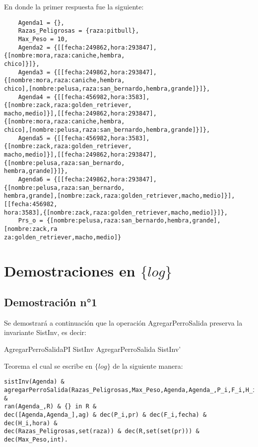 \documentclass[12pt,zed]{article}
\begin{document}
En donde la primer respuesta fue la siguiente:
\begin{verbatim}
    Agenda1 = {},  
    Razas_Peligrosas = {raza:pitbull},  
    Max_Peso = 10,  
    Agenda2 = {[[fecha:249862,hora:293847],{[nombre:mora,raza:caniche,hembra,
chico]}]},  
    Agenda3 = {[[fecha:249862,hora:293847],{[nombre:mora,raza:caniche,hembra,
chico],[nombre:pelusa,raza:san_bernardo,hembra,grande]}]},  
    Agenda4 = {[[fecha:456982,hora:3583],{[nombre:zack,raza:golden_retriever,
macho,medio]}],[[fecha:249862,hora:293847],{[nombre:mora,raza:caniche,hembra,
chico],[nombre:pelusa,raza:san_bernardo,hembra,grande]}]},  
    Agenda5 = {[[fecha:456982,hora:3583],{[nombre:zack,raza:golden_retriever,
macho,medio]}],[[fecha:249862,hora:293847],{[nombre:pelusa,raza:san_bernardo,
hembra,grande]}]},  
    Agenda6 = {[[fecha:249862,hora:293847],{[nombre:pelusa,raza:san_bernardo,
hembra,grande],[nombre:zack,raza:golden_retriever,macho,medio]}],[[fecha:456982,
hora:3583],{[nombre:zack,raza:golden_retriever,macho,medio]}]},  
    Prs_o = {[nombre:pelusa,raza:san_bernardo,hembra,grande],[nombre:zack,ra
za:golden_retriever,macho,medio]}
\end{verbatim}

\section*{Demostraciones en $\{log\}$}

\subsection*{Demostración n°1}

Se demostrará a continuación que la operación AgregarPerroSalida preserva la invariante SistInv, es decir: \\

\begin{theorem}{AgregarPerroSalidaPI}
SistInv \land AgregarPerroSalida \implies SistInv'
\end{theorem}

Teorema el cual se escribe en $\{log\}$ de la siguiente manera:

\begin{verbatim}
sistInv(Agenda) &
agregarPerroSalida(Razas_Peligrosas,Max_Peso,Agenda,Agenda_,P_i,F_i,H_i) &
ran(Agenda_,R) & {} in R &
dec([Agenda,Agenda_],ag) & dec(P_i,pr) & dec(F_i,fecha) & dec(H_i,hora) &
dec(Razas_Peligrosas,set(raza)) & dec(R,set(set(pr))) & dec(Max_Peso,int).
\end{verbatim}
\end{document}
